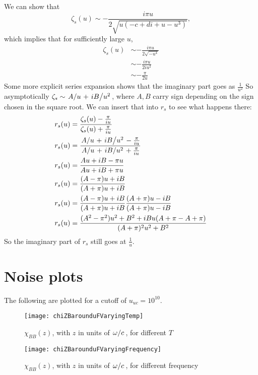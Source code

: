 \documentclass[11pt]{article}
\begin{document}
	We can show that
	\begin{equation}
		\zeta_s(u) \sim - \frac{i \pi u}{2 \sqrt{u\left( - c + di + u - u^3 \right)}},
	\end{equation}
	which implies that for sufficiently large $u$,
	\begin{align}
		\zeta_s(u) &\sim - \frac{i \pi u}{2 \sqrt{- u^4}} \\
		&\sim - \frac{i \pi u}{2 i u^2} \\
		&\sim - \frac{\pi }{2 u}
	\end{align}
	Some more explicit series expansion shows that the imaginary part goes as $\frac{1}{u^2}$
	So asymptotically $\zeta_s \sim \flatfrac{A}{u} + \flatfrac{i B}{u^2}$, where $A, B$ carry sign depending on the sign chosen in the square root.
	We can insert that into $r_s$ to see what happens there:
	\begin{align}
		r_s(u) &= \frac{\zeta_s(u) - \frac{\pi}{iu }}{\zeta_s(u) + \frac{\pi}{iu}} \\
		r_s(u) &= \frac{\flatfrac{A}{u} + \flatfrac{i B}{u^2} - \frac{\pi}{iu}}{\flatfrac{A}{u} + \flatfrac{i B}{u^2} + \frac{\pi}{iu}} \\
		r_s(u) &= \frac{A u + i B - \pi u}{A u + i B + \pi u} \\
		r_s(u) &= \frac{(A - \pi) u + i B}{(A + \pi)u + i B } \\
		r_s(u) &= \frac{(A - \pi) u + i B}{(A + \pi)u + i B } \frac{{(A + \pi)u - i B }}{{(A + \pi)u - i B }} \\
		r_s(u) &= \frac{(A^2 - \pi^2) u^2 + B^2  + i B u(A + \pi - A + \pi)}{(A + \pi)^2 u^2 + B^2 }
	\end{align}
	So the imaginary part of $r_s$ still goes at $\frac{1}{u}$.


	\section{Noise plots} \label{sec:plots}

	The following are plotted for a cutoff of $u_{uc} = 10^{10}$.

	\begin{figure}[htp]
		\centering
		\texttt{[image: chiZBarounduFVaryingTemp]}
		\caption{$\chi_{BB}(z)$, with $z$ in units of $\flatfrac{\omega}{c}$, for different $T$} \label{fig:temp}
	\end{figure}

	\begin{figure}[htp]
		\centering
		\texttt{[image: chiZBarounduFVaryingFrequency]}
		\caption{$\chi_{BB}(z)$, with $z$ in units of $\flatfrac{\omega}{c}$, for different frequency} \label{fig:frequency}
	\end{figure}
\end{document}
